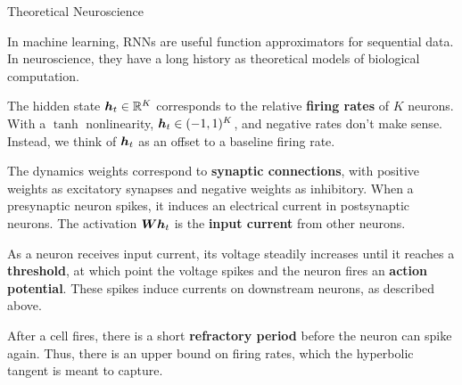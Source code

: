 \documentclass[aspectratio=169]{beamer}
\begin{document}
\begin{frame}[t,allowframebreaks]{Theoretical Neuroscience}\label{theoretical-neuroscience}

In machine learning, RNNs are useful function
approximators for sequential data. In neuroscience, they
have a long history as theoretical models of biological computation.

The hidden state \(\boldsymbol{h}_t \in \mathbb{R}^K\) corresponds to
the relative \textbf{firing rates} of \(K\) neurons. With a $\tanh$ nonlinearity, \(\boldsymbol{h}_t \in (-1, 1)^K\), and negative rates don't
make sense. Instead, we think of \(\boldsymbol{h}_t\) as an offset to a
baseline firing rate.

The dynamics weights correspond to \textbf{synaptic connections}, with
positive weights as excitatory synapses and negative weights as
inhibitory. When a presynaptic neuron spikes, it induces an electrical
current in postsynaptic neurons. The
activation \(\boldsymbol{W} \boldsymbol{h}_t\) is the \textbf{input current}
from other neurons.

As a neuron receives input current, its voltage steadily increases until
it reaches a \textbf{threshold}, at which point the voltage spikes and
the neuron fires an \textbf{action potential}. These spikes induce
currents on downstream neurons, as described above. 

After a cell fires,
there is a short \textbf{refractory period} before the neuron can spike
again. Thus, there is an upper bound on firing rates, which the
hyperbolic tangent is meant to capture.

\end{frame}
\end{document}
